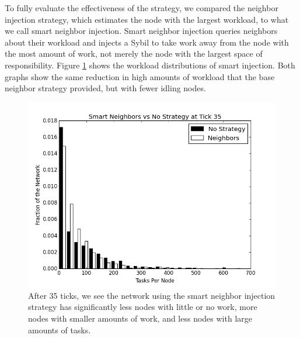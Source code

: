 \documentclass[10pt,conference]{IEEEtran}
\begin{document}
	
	
	To fully evaluate the effectiveness of the strategy, we compared the neighbor injection strategy, which estimates the node with the largest workload, to what we call smart neighbor injection.
	Smart neighbor injection queries neighbors about their workload and injects a Sybil to take work away from the node with the most amount of work, not merely the node with the largest space of responsibility.
	Figure \ref{fig:neighborsStableSmartHist35} shows the workload distributions of smart injection.
	Both graphs show the same reduction in high amounts of workload that the base neighbor strategy provided, but with fewer idling nodes.
	
	
%	
	
	\begin{figure}
		\centering
		\includegraphics[width=0.9\linewidth]{figs/neighborsStableSmartHist35}
		\caption[Smart Neighbor injection  vs no strategy after 35 ticks.]{After 35 ticks, we see the network using the smart neighbor injection strategy has significantly less nodes with little or no work, more nodes with smaller amounts of work, and less nodes with large amounts of tasks.}
		\label{fig:neighborsStableSmartHist35}
	\end{figure}
	
\end{document}
